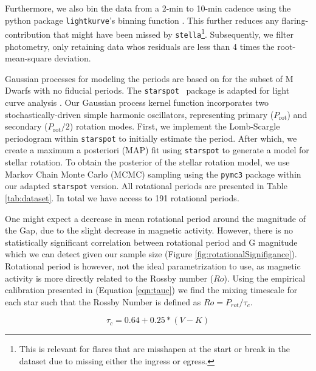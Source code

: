Furthermore, we also bin the data from a 2-min to 10-min cadence using the
python package \texttt{lightkurve}'s binning function
\citep{LightkurveCollaborationLightkurve2018,GeertBarentsenKeplerGO2020}. This
further reduces any flaring-contribution that might have been missed by
\texttt{stella}\footnote{This is relevant for flares that are misshapen at the
start or break in the dataset due to missing either the ingress or egress.}.
Subsequently, we filter photometry, only retaining data whos residuals are
less than 4 times the root-mean-square deviation.  

Gaussian processes for modeling the periods are based on
\citet{AngusInferring2018} for the subset of M Dwarfs with no fiducial periods.
The \texttt{starspot} \ package is adapted for light curve analysis
\citep{AngusRuthAngus2021, Angus2023}. Our Gaussian process kernel function
incorporates two stochastically-driven simple harmonic oscillators,
representing primary ($P_\textrm{rot}$) and secondary ($P_\textrm{rot}/2$)
rotation modes. First, we implement the Lomb-Scargle periodogram within
\texttt{starspot} to initially estimate the period. After which, we create a
maximum a posteriori (MAP) fit using \texttt{starspot} to generate a model for
stellar rotation. To obtain the posterior of the stellar rotation model, we use
Markov Chain Monte Carlo (MCMC) sampling using the \texttt{pymc3} package
\citep{SalvatierProbabilistic2016} within our adapted \texttt{starspot}
version. All rotational periods are presented in Table \ref{tab:dataset}. In
total we have access to 191 rotational periods.



One might expect a decrease in mean rotational period around the magnitude of
the Gap, due to the slight decrease in magnetic activity. However, there is no
statistically significant correlation between rotational period and G
magnitude which we can detect given our sample size (Figure
\ref{fig:rotationalSignifigance}). Rotational period is however, not the ideal
parametrization to use, as magnetic activity is more directly related to the
Rossby number ($Ro$). Using the empirical calibration presented in
\citet{Wright2018} (Equation \ref{eqn:tauc}) we find the mixing timescale for
each star such that the Rossby Number is defined as $Ro = P_{rot}/\tau_{c}$.

\begin{equation}\label{eqn:tauc}
  \tau_{c} = 0.64 + 0.25 * (V-K)
\end{equation}

